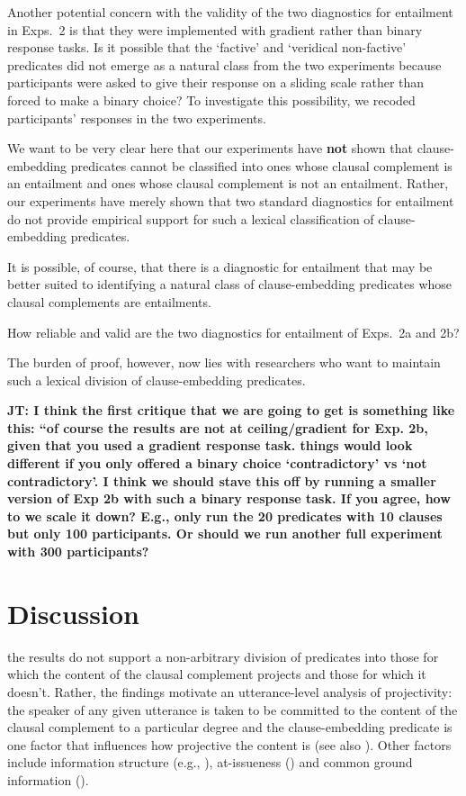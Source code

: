 \documentclass[11pt,fleqn]{article}
\newcommand{\6}{\mbox{$[\hspace*{-.6mm}[$}}
\newcommand{\9}{\mbox{$]\hspace*{-.6mm}]$}}
\newcommand{\jt}[1]{\textbf{\color{blue}JT: #1}}
\begin{document}
{Another potential concern with the validity of the two diagnostics for entailment in Exps.~2 is that they were implemented with gradient rather than binary response tasks. Is it possible that the `factive' and `veridical non-factive' predicates did not emerge as a natural class from the two experiments because participants were asked to give their response on a sliding scale rather than forced to make a binary choice? To investigate this possibility, we recoded participants' responses in the two experiments.


We want to be very clear here that our experiments have {\bf not} shown that clause-embedding predicates cannot be classified into ones whose clausal complement is an entailment and ones whose clausal complement is not an entailment. Rather, our experiments have merely shown that two standard diagnostics for entailment do not provide empirical support for such a lexical classification of clause-embedding predicates. 

It is possible, of course, that there is a diagnostic for entailment that may be better suited to identifying a natural class of clause-embedding predicates whose clausal complements are entailments. 


How reliable and valid are the two diagnostics for entailment of Exps.~2a and 2b? 

 The burden of proof, however, now lies with researchers who want to maintain such a lexical division of clause-embedding predicates. 

\jt{I think the first critique that we are going to get is something like this: ``of course the results are not at ceiling/gradient for Exp. 2b, given that you used a gradient response task. things would look different if you only offered a binary choice `contradictory' vs `not contradictory'. I think we should stave this off by running a smaller version of Exp 2b with such a binary response task. If you agree, how to we scale it down? E.g., only run the 20 predicates with 10 clauses but only 100 participants. Or should we run another full experiment with 300 participants?}

\section{Discussion}\label{s4}

the results do not support a non-arbitrary division of predicates into those for which the content of the clausal complement projects and those for which it doesn't.  Rather, the findings motivate an utterance-level analysis of projectivity: the speaker of any given utterance is taken to be committed to the content of the clausal complement to a particular degree and the clause-embedding predicate is one factor that influences how projective the content is (see also \citealt{tbd-variability}). Other factors include information structure (e.g., \citealt{cummins-rohde2015,tonhauser-salt26,djaerv-bacovcin-salt27}), at-issueness (\citealt{tbd-variability}) and common ground information (\citealt{gazdar79a,tonhauser-etal-eval}).


}
\end{document}
